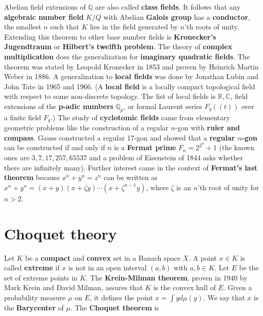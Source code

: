 \documentclass[12pt]{amsart}
\begin{document}
Abelian field extensions of $\mathbb{Q}$ are also called {\bf class fields}.
It follows that any {\bf algebraic number field} $K/Q$ with Abelian {\bf Galois group}
has a {\bf conductor}, the smallest $n$ such that $K$ lies in the field generated by $n$'th
roots of unity. Extending this theorem to other base number fields is {\bf Kronecker's Jugendtraum}
or {\bf Hilbert's twelfth problem}. The theory of {\bf complex multiplication} does the
generalization for {\bf imaginary quadratic fields}.
The theorem was stated by Leopold Kronecker in 1853 and proven by Heinrich Martin
Weber in 1886. A generalization to {\bf local fields} was done by Jonathan Lubin and
John Tate in 1965 and 1966. (A {\bf local field} is a locally compact topological field with respect
to some non-discrete topology. The list of local fields is $\mathbb{R},\mathbb{C}$, field extensions of the
{\bf p-adic numbers} $\mathbb{Q}_p$, or formal Laurent series $F_q((t))$ over a finite field $F_q$.)
The study of {\bf cyclotomic fields} came from elementary geometric problems like the construction of a regular
$n$-gon with {\bf ruler and compass}. Gauss constructed a regular 17-gon and showed that a {\bf regular $n$-gon}
can be constructed if and only if $n$ is a {\bf Fermat prime} $F_n=2^{2^n}+1$ 
(the known ones are $3,7,17,257,65537$ and a problem of Eisenstein of 1844 asks whether 
there are infinitely many). 
Further interest came in the context of {\bf Fermat's last theorem} because $x^n+y^n=z^n$ can be written as 
$x^n+y^n=(x+y) (x+\zeta y) \cdots (x+\zeta^{n-1} y)$, where $\zeta$ is an $n$'th root of unity
for $n>2$. 

\section{Choquet theory}

Let $K$ be a {\bf compact} and {\bf convex} set in a Banach space $X$. A point $x \in K$
is called {\bf extreme} if $x$ is not in an open interval $(a,b)$ with $a,b \in K$.
Let $E$ be the set of extreme points in $K$.
The {\bf Krein-Milman theorem}, proven in 1940 by Mark Krein and David Milman,
assures that $K$ is the convex hull of $E$.
 Given a probability measure $\mu$ on $E$, it defines the point $x=\int y d\mu(y)$.
We say that $x$ is the {\bf Barycenter} of $\mu$. The {\bf Choquet theorem} is
\end{document}
